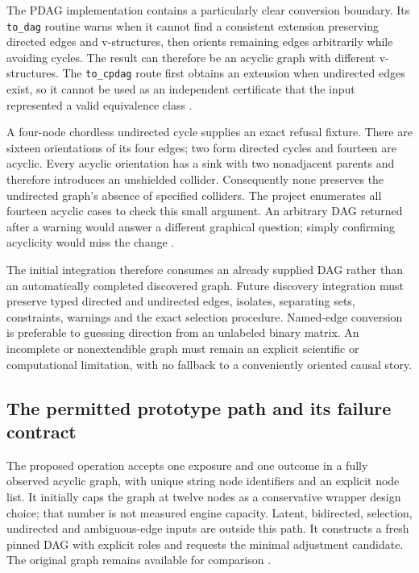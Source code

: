 The PDAG implementation contains a particularly clear conversion boundary.
Its \texttt{to\_dag} routine warns when it cannot find a consistent
extension preserving directed edges and v-structures, then orients remaining
edges arbitrarily while avoiding cycles. The result can therefore be an
acyclic graph with different v-structures. The \texttt{to\_cpdag} route
first obtains an extension when undirected edges exist, so it cannot be
used as an independent certificate that the input represented a valid
equivalence class \citep{exec13_pgmpy_reuse_primary}.

A four-node chordless undirected cycle supplies an exact refusal fixture.
There are sixteen orientations of its four edges; two form directed cycles
and fourteen are acyclic. Every acyclic orientation has a sink with two
nonadjacent parents and therefore introduces an unshielded collider.
Consequently none preserves the undirected graph's absence of specified
colliders. The project enumerates all fourteen acyclic cases to check this
small argument. An arbitrary DAG returned after a warning would answer a
different graphical question; simply confirming acyclicity would miss the
change \citep{exec13_pgmpy_reuse_oracle}.

The initial integration therefore consumes an already supplied DAG rather
than an automatically completed discovered graph. Future discovery
integration must preserve typed directed and undirected edges, isolates,
separating sets, constraints, warnings and the exact selection procedure.
Named-edge conversion is preferable to guessing direction from an unlabeled
binary matrix. An incomplete or nonextendible graph must remain an explicit
scientific or computational limitation, with no fallback to a conveniently
oriented causal story.

\subsection{The permitted prototype path and its failure contract}

The proposed operation accepts one exposure and one outcome in a fully
observed acyclic graph, with unique string node identifiers and an explicit
node list. It initially caps the graph at twelve nodes as a conservative
wrapper design choice; that number is not measured engine capacity.
Latent, bidirected, selection, undirected and ambiguous-edge inputs are
outside this path. It constructs a fresh pinned DAG with explicit roles
and requests the minimal adjustment candidate. The original graph remains
available for comparison \citep{exec13_pgmpy_reuse_oracle}.

